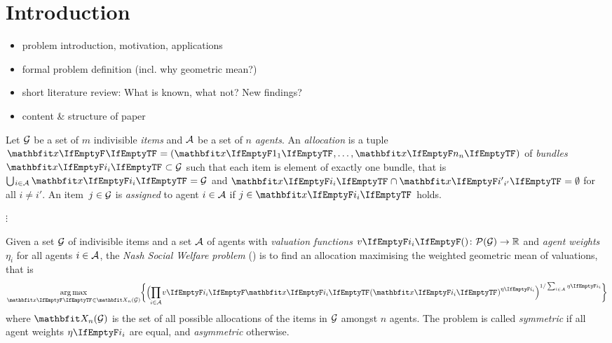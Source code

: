 \section{Introduction}
\label{sec:intro}

\begin{itemize}
	\item
	problem introduction, motivation, applications

	\item
	formal problem definition (incl. why geometric mean?)

	\item
	short literature review: What is known, what not? New findings?

	\item
	content \& structure of paper
\end{itemize}

\begin{definition}
	Let \(\mathcal{G}\) be a set of \(m\) indivisible \emph{items} and \(\mathcal{A}\) be a set of \(n\) \emph{agents}.
	An \emph{allocation} is a tuple \(\alloc[][] = ( \alloc[][1], \dots, \alloc[][n] )\) of \emph{bundles} \(\alloc \subset \goods\) such that each item is element of exactly one bundle, that is \(\mathop{\bigcup\hspace{-1pt}_{i \in \agents}} \alloc = \goods\) and \(\alloc \cap \alloc[][i'] = \emptyset\) for all \(i \neq i'\).
	An item~\(j \in \mathcal{G}\) is \emph{assigned} to agent \(i \in \mathcal{A}\) if \(j \in \alloc\) holds.
\end{definition}

\(\vdots\)

\begin{problem}
	Given a set \(\mathcal{G}\) of indivisible items and a set \(\mathcal{A}\) of agents with \emph{valuation functions} \(\valuations \colon \powerset[\goods] \to \real\) and \emph{agent weights} \(\eta_i\) for all agents \(i \in \mathcal{A}\), the \emph{Nash Social Welfare problem} (\NSW) is to find an allocation maximising the weighted geometric mean of valuations, that is
	\begin{equation*}
		\argmax_{\alloc[][] \in \allallocs{n}{\goods}} \braces[\bigg]{ \paren[\Big]{ \smashoperator{\prod_{i \in \agents}} \valuations[\alloc]^{\weight} }^{1 / \sum_{i \in \agents} \weight} }
	\end{equation*}
	where \(\allallocs{n}{\goods}\) is the set of all possible allocations of the items in \(\mathcal{G}\) amongst \(n\) agents.
	The problem is called \emph{symmetric} if all agent weights \(\weight\) are equal, and \emph{asymmetric} otherwise.
\end{problem}

